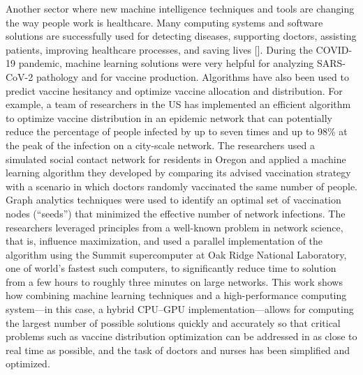 Another sector where new machine intelligence techniques and tools are changing the way people work is healthcare. Many computing systems and software solutions are successfully used for detecting diseases, supporting doctors, assisting patients, improving healthcare processes, and saving lives [\citealt{chap:6:Talia:2022}]. During the COVID-19 pandemic, machine learning solutions were\vadjust{\vspace*{-16pt}\pagebreak} very helpful for analyzing SARS-CoV-2 pathology and for vaccine production. Algorithms have also been used to predict vaccine hesitancy and optimize vaccine allocation and distribution. For example, a team of researchers in the US has implemented an efficient algorithm to optimize vaccine distribution in an epidemic network that can potentially reduce the percentage of people infected by up to seven times and up to 98\% at the peak of the infection on a city-scale network. The researchers used a simulated social contact network for residents in Oregon and applied a machine learning algorithm they developed by comparing its advised vaccination strategy with a scenario in which doctors randomly vaccinated the same number of people. Graph analytics techniques were used to identify an optimal set of vaccination nodes (``seeds'') that minimized the effective number of network infections. The researchers leveraged principles from a well-known problem in network science, that is, influence maximization, and used a parallel implementation of the algorithm using the Summit supercomputer at Oak Ridge National Laboratory, one of world's fastest such computers, to significantly reduce time to solution from a few hours to roughly three minutes on large networks. This work shows how combining machine learning techniques and a high-performance computing system---in this case, a hybrid CPU--GPU implementation---allows for computing the largest number of possible solutions quickly and accurately so that critical problems such as vaccine distribution optimization can be addressed in as close to real time as possible, and the task of doctors and nurses has been simplified and optimized.


